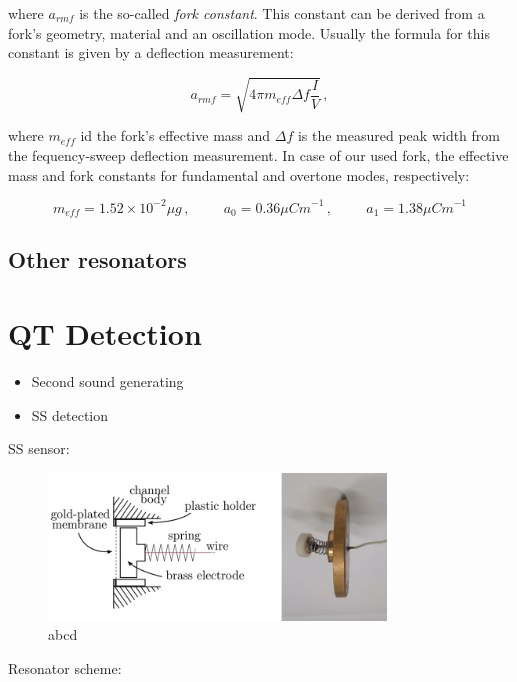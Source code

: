 where $a_{rmf}$ is the so-called \textit{fork constant}. This constant can be derived from a fork's geometry, material and an oscillation mode. Usually the formula for this constant is given by a deflection measurement:

\begin{equation}
a_{rmf} = \sqrt{4\pi m_{eff} \Delta f \frac{I}{V}}\,,
\end{equation}

where $m_{eff}$ id the fork's effective mass and $\Delta f$ is the measured peak width from the fequency-sweep deflection measurement. In case of our used fork, the effective mass and fork constants for fundamental and overtone modes, respectively:

\begin{equation}
m_{eff} = 1.52 \times 10^{-2} \mu\unit{g}\,,
\hspace{1cm}
a_0 = 0.36 \mu\unit{Cm}^{-1}\,,
\hspace{1cm}
a_1 = 1.38 \mu\unit{Cm}^{-1}
\end{equation}

\subsection*{Other resonators}
\todo

\section{QT Detection}
\begin{itemize}
	\item Second sound generating
	\item SS detection
\end{itemize}

SS sensor:

\begin{figure}[h]
	\centering
	\includegraphics[width=0.8\textwidth]{graphics/exp/sensor}
	\caption{abcd}
\end{figure}

Resonator scheme:

